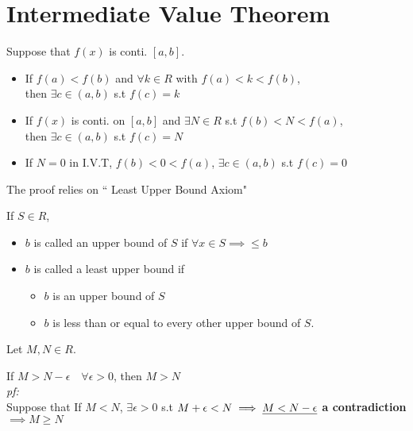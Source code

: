 \section{Intermediate Value Theorem}
\begin{theorem}
Suppose that $f(x)$ is conti. $[a, b]$.
\begin{itemize}
\item If $f(a) < f(b)$ and $\forall k \in R$ with $f(a) < k < f(b)$,\\
then $\exists c \in (a, b)$ s.t $f(c) = k$
\item If $f(x)$ is conti. on $[a, b]$ and $\exists N \in R$ s.t $f(b) < N < f(a)$,\\
then $\exists c \in (a, b)$ s.t $f(c) = N$
\item If $N = 0$ in I.V.T, $f(b) < 0 <f(a)$, $\exists c \in (a, b)$ s.t $f(c) = 0$
\end{itemize}
\end{theorem}
The proof relies on `` Least Upper Bound Axiom"
\begin{defn}
If $S \in R$,
\begin{itemize}
\item $b$ is called an upper bound of $S$ if $\forall x \in S \implies \leq b$
\item $b$ is called a least upper bound if
\begin{itemize}
\item $b$ is an upper bound of $S$ 
\item $b$ is less than or equal to every other upper bound of $S$.
\end{itemize}
\end{itemize}
\end{defn}

\begin{lemma}
Let $M, N \in R$.

If $M > N - \epsilon \quad \forall \epsilon > 0$, then $M > N$\\

\textit{pf:}\\
Suppose that If $M < N$, $\exists \epsilon > 0$ s.t $M + \epsilon < N\\
\implies \underline{M < N - \epsilon}$ \textbf{a contradiction} $\implies M \geq N$
\end{lemma}

